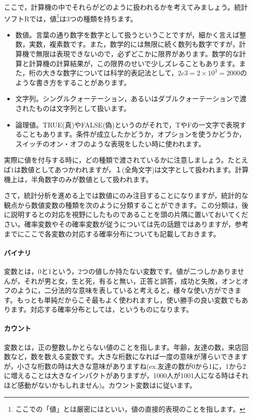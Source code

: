 \documentclass{ltjsbook}
\begin{document}
ここで，計算機の中でそれらがどのように扱われるかを考えてみましょう。統計ソフトRでは，値\footnote{ここでの「値」とは厳密にはといい，値の直接的表現のことを指します。}は3つの種類を持ちます。
\begin{itemize}
    \item 数値。言葉の通り数字を数字として扱うということですが，細かく言えば整数，実数，複素数です。また，数学的には無限に続く数列も数字ですが，計算機で無限は表現できないので，必ずどこかに限界があります。数学的な計算と計算機の計算結果が，この限界のせいで少しズレることもあります。また，桁の大きな数字については科学的表記法として，$2e3=2 \times 10^3 = 2000$のような書き方をすることがあります。
    \item 文字列。シングルクォーテーション，あるいはダブルクォーテーションで渡されたものは文字列として扱います。
    \item 論理値。TRUE(真)やFALSE(偽)というのがそれで，TやFの一文字で表現することもあります。条件が成立したかどうか，オプションを使うかどうか，スイッチのオン・オフのような表現をしたい時に使われます。
\end{itemize}
実際に値を付与する時に，どの種類で渡されているかに注意しましょう。たとえば$1$は数値としてあつかわれますが，１(全角文字)は文字として扱われます。計算機上は，半角数字のみが数値として扱われます。

さて，統計分析を進める上では数値にのみ注目することになりますが，統計的な観点から数値変数の種類を次のように分類することができます。この分類は，後に説明するとの対応を視野にしたものであることを頭の片隅に置いておいてください。確率変数やその確率変数が従うについては先の話題ではありますが，参考までにここで各変数の対応する確率分布についても記載しておきます。

\paragraph{バイナリ}
変数とは，0と1という，2つの値しか持たない変数です。値が二つしかありませんが，それが男と女，生と死，有ると無い，正答と誤答，成功と失敗，オンとオフのように，二分法的な意味を表していると考えると，様々な使い方ができます。もっとも単純だからこそ最もよく使われますし，使い勝手の良い変数でもあります。対応する確率分布としては，というものになります。
\paragraph{カウント}
変数とは，正の整数しかとらない値のことを指します。年齢，友達の数，来店回数など，数を数える変数です。大きな桁数になれば一度の意味が薄らいできますが，小さな桁数の時は大きな意味がありますね(ex.友達の数が0から1に，1から2に増えることは大きなインパクトがありますが，1000人が1001人になる時はそれほど感動がないかもしれません)。カウント変数はに従います。
\end{document}
